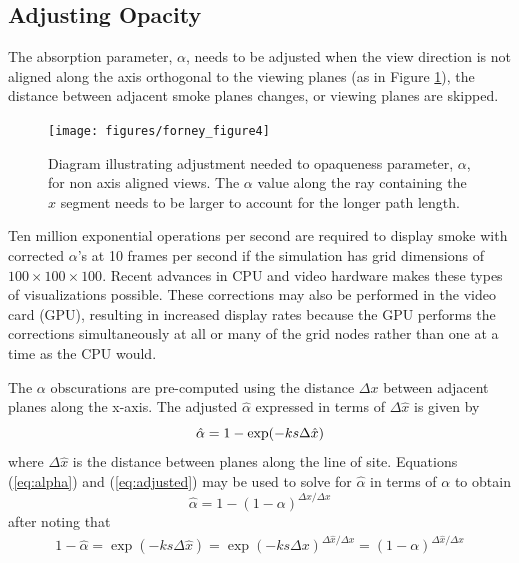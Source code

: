\documentclass[11pt,twoside]{book}
\newcommand{\figoptions}{htp}
\begin{document}
%
%

\subsection{Adjusting Opacity}

The absorption parameter, $\alpha$, needs to be adjusted when the
view direction is not aligned along the axis orthogonal to the
viewing planes (as in Figure \ref{figray}), the distance between
adjacent smoke planes changes, or viewing planes are skipped.
\begin{figure}[\figoptions]
\centerline{\texttt{[image: figures/forney\_figure4]}}
\caption [Diagram illustrating the adjustment needed to opaqueness
parameter, $\alpha$, for non axis aligned views.] { Diagram
illustrating adjustment needed to opaqueness parameter, $\alpha$,
for non axis aligned views. The $\alpha$ value along the ray
containing the $\hat{x}$ segment needs to be larger to account for
the longer path length. } \label{figray}
\end{figure}

Ten million exponential operations per second are required to
display smoke with corrected $\alpha$'s at 10 frames per second if
the simulation has grid dimensions of $100\times 100\times 100$.
Recent advances in CPU and video hardware makes these types of
visualizations possible. These corrections may also be performed
in the video card (GPU), resulting in increased display rates
because the GPU performs the corrections simultaneously at all or
many of the grid nodes rather than one at a time as the CPU would.

The $\alpha$ obscurations are pre-computed using the distance
$\Delta x$ between adjacent planes along the x-axis. The adjusted
$\hat{\alpha}$ expressed in terms of $\Delta\hat{x}$ is given by
\begin{equation}
\label{eq:adjusted}
\hat{\alpha}=1-\exp(-ks\Delta \hat{x})\\
\end{equation}
where $\Delta\hat{x}$ is the distance between planes along the line of site.
Equations (\ref{eq:alpha}) and (\ref{eq:adjusted}) may be used to
solve for $\hat{\alpha}$ in terms of $\alpha$ to obtain
\begin{equation}
\label{eq:alphahat}
\hat{\alpha}=1-(1-\alpha)^{\Delta\hat{x}/\Delta x}
\end{equation}
after noting that
\begin{eqnarray*}
1-\hat{\alpha}=\exp(-ks\Delta\hat{x})=\exp(-ks\Delta
x)^{\Delta\hat{x}/\Delta x}=(1-\alpha)^{\Delta\hat{x}/\Delta x}
\end{eqnarray*}
\end{document}
